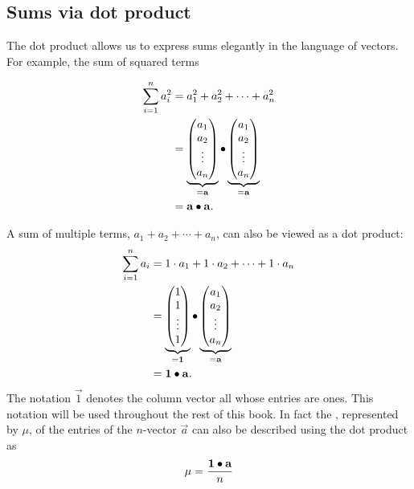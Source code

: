 \documentclass{ximera}
\begin{document}
\subsection{Sums via dot product}

The dot product allows us to express sums elegantly in the language of
vectors. For example, the sum of squared terms

\begin{align*}
  \sum_{i=1}^n a_i^2
  & = a_1^2 + a_2^2 + \cdots + a_n^2 \\
  & =
  \underbrace{
    \begin{pmatrix}
      a_1 \\ a_2 \\ \vdots \\ a_n
  \end{pmatrix}}_{=\mathbf{a}}
  \bullet
  \underbrace{
    \begin{pmatrix}
        a_1 \\ a_2 \\ \vdots \\ a_n
  \end{pmatrix}}_{=\mathbf{a}} \\
  &= \mathbf{a} \bullet \mathbf{a}.
\end{align*}

A sum of multiple terms, $a_1 + a_2 + \cdots + a_n$, can also be
viewed as a dot product:
  \begin{align*}
    \sum_{i=1}^n a_i
    & = 1 \cdot a_1 + 1 \cdot a_2 + \cdots + 1 \cdot a_n \\
    & =
      \underbrace{
      \begin{pmatrix}
        1 \\ 1 \\ \vdots \\ 1
      \end{pmatrix}}_{=\mathbf{1}}
      \bullet
      \underbrace{
      \begin{pmatrix}
        a_1 \\ a_2 \\ \vdots \\ a_n
      \end{pmatrix}}_{=\mathbf{a}} \\
      &= \mathbf{1} \bullet \mathbf{a}.
  \end{align*}
  The notation $\vec{1}$ denotes the column vector all whose entries
  are ones. This notation will be used throughout the rest of this
  book. In fact the , represented by $\mu$, of the entries of the
  $n$-vector $\vec{a}$ can also be described using the dot product as
  \[
  \mu = \frac{\mathbf{1}\bullet\mathbf{a}}{n}
  \]
\end{document}

